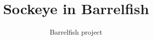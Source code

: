 \documentclass[a4paper,11pt,twoside]{report}
\title{Sockeye in Barrelfish}
\author{Barrelfish project}
\begin{document}
\maketitle			%

\begin{versionhistory}
\end{versionhistory}

\tableofcontents		%
\cleardoublepage
\setcounter{secnumdepth}{2}

\newcommand{\fnname}[1]{\textit{\texttt{#1}}}%
\newcommand{\datatype}[1]{\textit{\texttt{#1}}}%
\newcommand{\varname}[1]{\texttt{#1}}%
\newcommand{\keywname}[1]{\textbf{\texttt{#1}}}%
\newcommand{\pathname}[1]{\texttt{#1}}%
\newcommand{\tabindent}{\hspace*{3ex}}%
\end{document}
